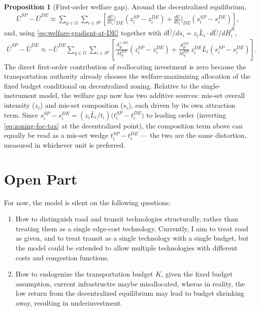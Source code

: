 \documentclass[12pt, a4paper]{article}
\theoremstyle{definition}
\newtheorem{proposition}{Proposition}
\theoremstyle{remark}
\begin{document}
\begin{proposition}[First-order welfare gap]
\label{prop:SP-gap}
Around the decentralized equilibrium,
\begin{align}
    \bar U^{SP}-\bar U^{DE}
    \approx
    \sum_{g\in G}
    \sum_{i\in S^g}
    \left[
    \frac{d\bar U}{dz_i}\bigg|_{DE}
    \left(
    z_i^{SP}-z_i^{DE}
    \right)
    +
    \frac{d\bar U}{ds_i}\bigg|_{DE}
    \left(
    s_i^{SP}-s_i^{DE}
    \right)
    \right],
\end{align}
and, using \eqref{eq:welfare-gradient-at-DE} together with $d\bar U/ds_i=z_i\bar L_i\cdot d\bar U/d\bar H_i^R$,
\begin{align}
    \bar U^{SP}-\bar U^{DE}
    \approx
    -
    \bar U^{DE}
    \sum_{g\in G}
    \sum_{i\in S^g}
    \left[
    \frac{A_{gi}^{z,DE}}{M_g^{DE}}
    \left(
    z_i^{SP}-z_i^{DE}
    \right)
    +
    \frac{A_{gi}^{DE}}{M_g^{DE}}\,z_i^{DE}\bar L_i
    \left(
    s_i^{SP}-s_i^{DE}
    \right)
    \right].
\end{align}
The direct first-order contribution of reallocating investment is zero because the transportation authority already chooses the welfare-maximizing allocation of the fixed budget conditional on decentralized zoning. Relative to the single-instrument model, the welfare gap now has two additive sources: mis-set overall intensity ($z_i$) and mis-set composition ($s_i$), each driven by its own attraction term. Since $s_i^{SP}-s_i^{DE}=(z_i\bar L_i/t_i)\bigl(t_i^{SP}-t_i^{DE}\bigr)$ to leading order (inverting \eqref{eq:zoning-foc-tax} at the decentralized point), the composition term above can equally be read as a mis-set wedge $t_i^{SP}-t_i^{DE}$ — the two are the same distortion, measured in whichever unit is preferred.
\end{proposition}
\section{Open Part}
For now, the model is silent on the following questions:
\begin{enumerate}
    \item How to distinguish road and transit technologies structurally, rather than treating them as a single edge-cost technology. Currently, I aim to treat road as given, and to treat transit as a single technology with a single budget, but the model could be extended to allow multiple technologies with different costs and congestion functions.
    \item How to endogenize the transportation budget $K$, given the fixed budget assumption, current infrastructre maybe misallocated, wheras in reality, the low return from the decentralized equilibrium may lead to budget shrinking away, resulting in underinvestment.
\end{enumerate}
\end{document}
